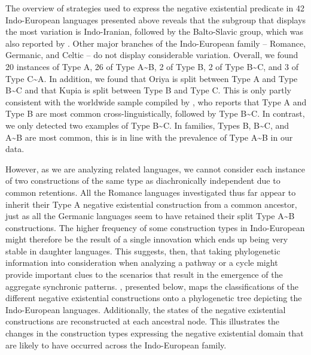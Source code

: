 ﻿\documentclass[output=paper]{langsci/langscibook}
\begin{document}
The overview of strategies used to express the negative existential
predicate in 42 Indo-European languages presented above reveals that the
subgroup that displays the most variation is Indo-Iranian, followed by the
Balto-Slavic group, which was also reported by \citet{Veselinova2014}.
Other major branches of the Indo-European family – Romance, Germanic, and
Celtic – do not display considerable variation. Overall, we found 20
instances of Type A, 26 of Type A{\textasciitilde}B, 2 of Type B, 2 of Type
B{\textasciitilde}C, and 3 of Type C{\textasciitilde}A. In addition, we
found that Oriya is split between Type A and Type B{\textasciitilde}C and
that Kupia is split between Type B and Type C. This is only partly
consistent with the worldwide sample compiled by
\citet[147]{Veselinova2016}, who reports that Type A and Type B are most
common cross-linguistically, followed by Type B{\textasciitilde}C. In
contrast, we only detected two examples of Type B{\textasciitilde}C. In
 families, Types B, B{\textasciitilde}C, and A{\textasciitilde}B are most common, this is in line with the prevalence of Type A{\textasciitilde}B in our data.

However, as we are analyzing related languages, we cannot consider each
instance of two constructions of the same type as diachronically
independent due to common retentions. All the Romance languages
investigated thus far appear to inherit their Type A negative existential
construction from a common ancestor, just as all the Germanic languages
seem to have retained their split Type A{\textasciitilde}B constructions.
The higher frequency of some construction types in Indo-European might
therefore be the result of a single innovation which ends up being very
stable in daughter languages. This suggests, then, that taking phylogenetic
information into consideration when analyzing a pathway or a cycle might
provide important clues to the scenarios that result in the emergence of
the aggregate synchronic patterns. , presented below,
maps the classifications of the different negative existential
constructions onto a phylogenetic tree depicting the Indo-European
languages. Additionally, the states of the negative existential
constructions are reconstructed at each ancestral node. This illustrates
the changes in the construction types expressing the negative existential
domain that are likely to have occurred across the Indo-European
family.%
\end{document}

